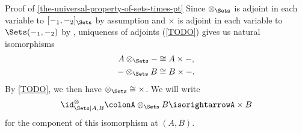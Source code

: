 \begin{Proof}{Proof of \cref{the-universal-property-of-sets-times-pt}}
    Since $\otimes_{\Sets}$ is adjoint in each variable to $[-_{1},-_{2}]_{\Sets}$ by assumption and $\times$ is adjoint in each variable to $\Sets(-_{1},-_{2})$ by , uniqueness of adjoints (\cref{TODO}) gives us natural isomorphisms
    \begin{align*}
        A\otimes_{\Sets}- &\cong A\times-,\\
        -\otimes_{\Sets}B &\cong B\times-.
    \end{align*}
    By \cref{TODO}, we then have $\mathord{\otimes_{\Sets}}\cong\mathord{\times}$. We will write
    \[
        \id^{\otimes}_{\Sets|A,B}%
        \colon%
        A\otimes_{\Sets}B%
        \isorightarrow%
        A\times B%
    \]%
    for the component of this isomorphism at $(A,B)$.


\end{Proof}
